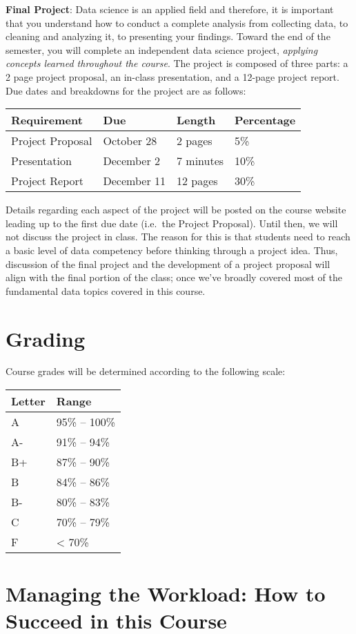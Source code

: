 \documentclass[
  12pt,
]{article}
\begin{document}
\textbf{Final Project}: Data science is an applied field and therefore,
it is important that you understand how to conduct a complete analysis
from collecting data, to cleaning and analyzing it, to presenting your
findings. Toward the end of the semester, you will complete an
independent data science project, \emph{applying concepts learned
throughout the course}. The project is composed of three parts: a 2 page
project proposal, an in-class presentation, and a 12-page project
report. Due dates and breakdowns for the project are as follows:

\begin{longtable}[]{@{}llll@{}}
\toprule
\textbf{Requirement} & \textbf{Due} & \textbf{Length} &
\textbf{Percentage}\tabularnewline
\midrule
\endhead
Project Proposal & October 28 & 2 pages & 5\%\tabularnewline
Presentation & December 2 & 7 minutes & 10\%\tabularnewline
Project Report & December 11 & 12 pages & 30\%\tabularnewline
\bottomrule
\end{longtable}

Details regarding each aspect of the project will be posted on the
course website leading up to the first due date (i.e.~the Project
Proposal). Until then, we will not discuss the project in class. The
reason for this is that students need to reach a basic level of data
competency before thinking through a project idea. Thus, discussion of
the final project and the development of a project proposal will align
with the final portion of the class; once we've broadly covered most of
the fundamental data topics covered in this course.

\hypertarget{grading}{%
\section{Grading}\label{grading}}

Course grades will be determined according to the following scale:

\begin{longtable}[]{@{}ll@{}}
\toprule
Letter & Range\tabularnewline
\midrule
\endhead
A & 95\% -- 100\%\tabularnewline
A- & 91\% -- 94\%\tabularnewline
B+ & 87\% -- 90\%\tabularnewline
B & 84\% -- 86\%\tabularnewline
B- & 80\% -- 83\%\tabularnewline
C & 70\% -- 79\%\tabularnewline
F & \textless{} 70\%\tabularnewline
\bottomrule
\end{longtable}

\hypertarget{managing-the-workload-how-to-succeed-in-this-course}{%
\section{Managing the Workload: How to Succeed in this
Course}\label{managing-the-workload-how-to-succeed-in-this-course}}
\end{document}
